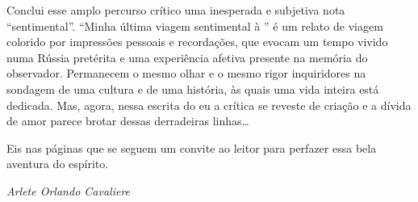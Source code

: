 Conclui esse amplo percurso crítico uma inesperada e subjetiva nota
``sentimental''. ``Minha última viagem sentimental à '' é um relato
de viagem colorido por impressões pessoais e recordações, que evocam um
tempo vivido numa Rússia pretérita e uma experiência afetiva presente na
memória do observador. Permanecem o mesmo olhar e o mesmo rigor
inquiridores na sondagem de uma cultura e de uma história, às quais uma
vida inteira está dedicada. Mas, agora, nessa escrita do eu a crítica se
reveste de criação e a dívida de amor parece brotar dessas derradeiras
linhas\ldots{}

Eis nas páginas que se seguem um convite ao leitor para perfazer essa
bela aventura do espírito.

\begin{flushright}
\emph{Arlete Orlando Cavaliere}
\end{flushright}


